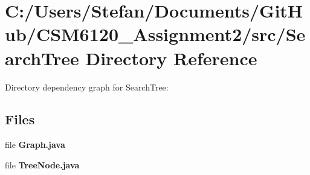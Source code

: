 \section{C\+:/\+Users/\+Stefan/\+Documents/\+Git\+Hub/\+C\+S\+M6120\+\_\+\+Assignment2/src/\+Search\+Tree Directory Reference}
\label{dir_e1b541442b5a80c135deed6082c8a1f8}
Directory dependency graph for Search\+Tree\+:
\subsection*{Files}
\begin{DoxyCompactItemize}
\item 
file {\bf Graph.\+java}
\item 
file {\bf Tree\+Node.\+java}
\end{DoxyCompactItemize}

